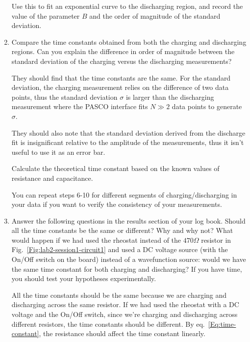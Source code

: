 \documentclass[12pt]{report}
\begin{document}
\begin{enumerate}
Use this to fit an exponential curve to the discharging region, and {\color{blue} record the value of the parameter $B$ and the order of magnitude of the standard deviation}.

\item {\color{blue} Compare the time constants obtained from both the charging and discharging regions. 
Can you explain the difference in order of magnitude between the standard deviation of the charging versus the discharging measurements?
\begin{tcolorbox}[title=Answer]
They should find that the time constants are the same.
For the standard deviation, the charging measurement relies on the difference of two data points, thus the standard deviation $\sigma$ is larger than the discharging measurement where the PASCO interface fits $N \gg 2$ data points to generate $\sigma$.
\end{tcolorbox}
\begin{tcolorbox}
They should also note that the standard deviation derived from the discharge fit is insignificant relative to the amplitude of the measurements, thus it isn't useful to use it as an error bar.
\end{tcolorbox}
Calculate the theoretical time constant based on the known values of resistance and capacitance.} 
You can repeat steps 6-10 for different segments of charging/discharging in your data if you want to verify the consistency of your measurements.

\item {\color{blue}Answer the following questions in the results section of your log book.}  Should all the time constants be the same or different? Why and why not? 
What would happen if we had used the rheostat instead of the $470\Omega$ resistor in Fig.~\ref{Fig:lab2-session1-circuit1} and used a DC voltage source (with the On/Off switch on the board) instead of a wavefunction source: would we have the same time constant for both charging and discharging? 
If you have time, you should test your hypotheses experimentally.

\begin{tcolorbox}[title=Answer]
All the time constants should be the same because we are charging and discharging across the same resistor. 
If we had used the rheostat with a DC voltage and the On/Off switch, since we're charging and discharging across different resistors, the time constants should be different. By eq.~\eqref{Eq:time-constant}, the resistance should affect the time constant linearly.
\end{tcolorbox}


\end{enumerate}
\end{document}
